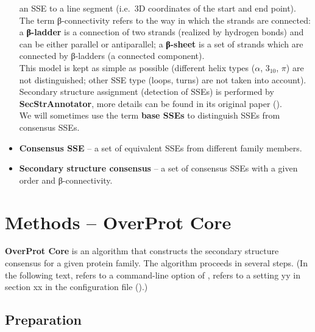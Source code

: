 \documentclass{article}
\begin{document}
\begin{itemize}
    an SSE to a line segment (i.e.~3D coordinates of the start and end
    point).\\
    The term β-connectivity refers to the way in which the strands are
    connected: a \textbf{β-ladder} is a connection of two strands (realized 
    by hydrogen bonds) and can be either parallel or antiparallel; 
    a \textbf{β-sheet} is a set of
    strands which are connected by β-ladders (a connected component).\\
    This model is kept as simple as possible (different helix types
    (\(\alpha\), \(3_{10}\), \(\pi\)) are not distinguished; other SSE
    type (loops, turns) are not taken into account). Secondary structure
    assignment (detection of SSEs) is performed by
    \textbf{SecStrAnnotator}, more details can be found in its original paper 
    ().\\
    We will sometimes use the term \textbf{base SSEs} to distinguish SSEs from consensus SSEs.
  \item
    \textbf{Consensus SSE} -- a set of equivalent SSEs from different
    family members. 
  \item
    \textbf{Secondary structure consensus} -- a set of consensus SSEs
    with a given order and β-connectivity.
\end{itemize}




\section{Methods -- OverProt Core}

\textbf{OverProt Core} is an algorithm that constructs the secondary
structure consensus for a given protein family. The algorithm proceeds
in several steps. 
(In the following text,  refers to a command-line option of ,
 refers to a setting yy in section xx in the configuration file ().)



\subsection{Preparation}
\end{document}

